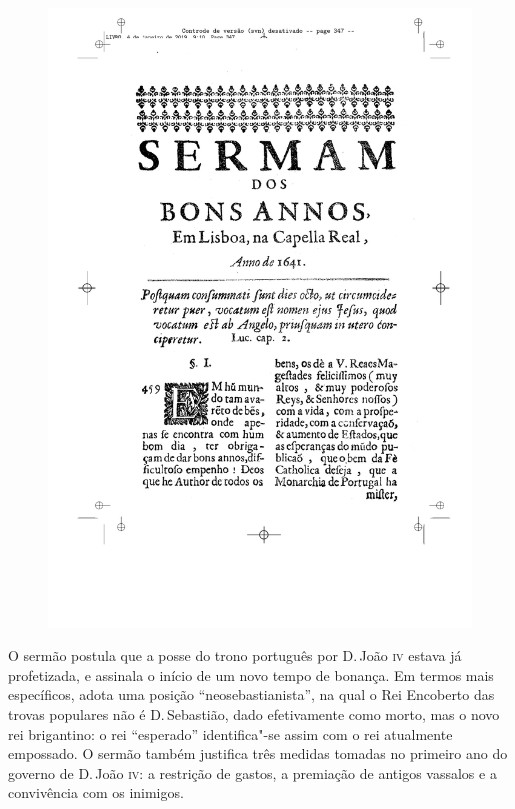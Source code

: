 \pagebreak
\thispagestyle{empty}
\begin{figure}[ht!]
\includegraphics[width=\textwidth]{./imgs/bonsanos.pdf}  
\end{figure}

\pagebreak
\movetoevenpage
\thispagestyle{empty}
\mbox{}\vfill
\noindent{}O sermão postula que a posse do trono português por D.\,João \textsc{iv} estava já profetizada, e assinala o início de um novo tempo de bonança. Em termos mais específicos, adota uma posição ``neosebastianista'', na qual o Rei Encoberto das trovas populares não é D.\,Sebastião, dado efetivamente como morto, mas o novo rei brigantino: o rei ``esperado'' identifica"-se assim com o rei atualmente empossado. O sermão também justifica três medidas tomadas no primeiro ano do governo de D.\,João \textsc{iv}: a restrição de gastos, a premiação de antigos
vassalos e a convivência com os inimigos.

